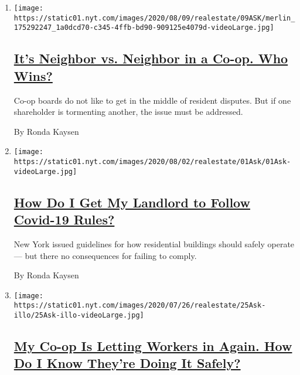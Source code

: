 \begin{enumerate}
\def\labelenumi{\arabic{enumi}.}
\item
  \texttt{[image: https://static01.nyt.com/images/2020/08/09/realestate/09ASK/merlin\_175292247\_1a0dcd70-c345-4ffb-bd90-909125e4079d-videoLarge.jpg]}

  \hypertarget{its-neighbor-vs-neighbor-in-a-co-op-who-wins}{%
  \subsection{\texorpdfstring{\href{/2020/08/08/realestate/neighbor-complaints-co-ops.html}{It's
  Neighbor vs. Neighbor in a Co-op. Who
  Wins?}}{It's Neighbor vs. Neighbor in a Co-op. Who Wins?}}\label{its-neighbor-vs-neighbor-in-a-co-op-who-wins}}

  Co-op boards do not like to get in the middle of resident disputes.
  But if one shareholder is tormenting another, the issue must be
  addressed.

  By Ronda Kaysen
\item
  \texttt{[image: https://static01.nyt.com/images/2020/08/02/realestate/01Ask/01Ask-videoLarge.jpg]}

  \hypertarget{how-do-i-get-my-landlord-to-follow-covid-19-rules}{%
  \subsection{\texorpdfstring{\href{/2020/08/01/realestate/coronavirus-covid-apartment-buildings.html}{How
  Do I Get My Landlord to Follow Covid-19
  Rules?}}{How Do I Get My Landlord to Follow Covid-19 Rules?}}\label{how-do-i-get-my-landlord-to-follow-covid-19-rules}}

  New York issued guidelines for how residential buildings should safely
  operate --- but there no consequences for failing to comply.

  By Ronda Kaysen
\item
  \texttt{[image: https://static01.nyt.com/images/2020/07/26/realestate/25Ask-illo/25Ask-illo-videoLarge.jpg]}

  \hypertarget{my-co-op-is-letting-workers-in-again-how-do-i-know-theyre-doing-it-safely}{%
  \subsection{\texorpdfstring{\href{/2020/07/25/realestate/coronavirus-reopening-workers-in-buildings-rules.html}{My
  Co-op Is Letting Workers in Again. How Do I Know They're Doing It
  Safely?}}{My Co-op Is Letting Workers in Again. How Do I Know They're Doing It Safely?}}\label{my-co-op-is-letting-workers-in-again-how-do-i-know-theyre-doing-it-safely}}


\end{enumerate}
